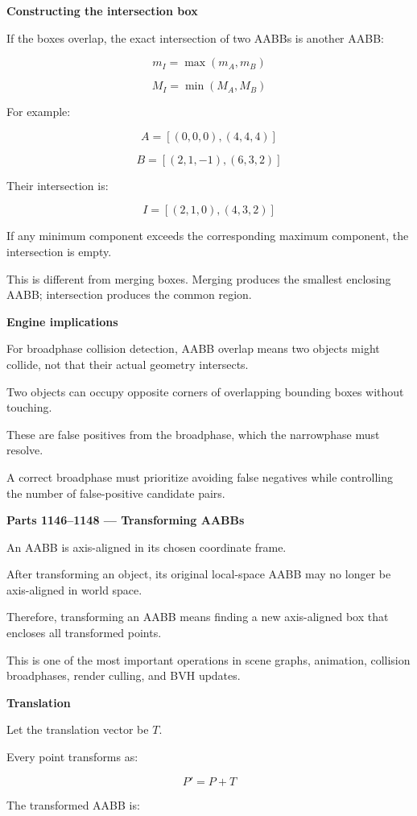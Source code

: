\textbf{Constructing the intersection box}

If the boxes overlap, the exact intersection of two AABBs is another AABB:

\[
\boxed{ m_I=\max(m_A,m_B) }
\]

\[
\boxed{ M_I=\min(M_A,M_B) }
\]

For example:

\[
A=[(0,0,0),(4,4,4)]
\]

\[
B=[(2,1,-1),(6,3,2)]
\]

Their intersection is:

\[
\boxed{I=[(2,1,0),(4,3,2)]}
\]

If any minimum component exceeds the corresponding maximum component, the intersection is empty.

This is different from merging boxes. Merging produces the smallest enclosing AABB; intersection produces the common region.

\textbf{Engine implications}

For broadphase collision detection, AABB overlap means two objects might collide, not that their actual geometry intersects.

Two objects can occupy opposite corners of overlapping bounding boxes without touching.

These are false positives from the broadphase, which the narrowphase must resolve.

A correct broadphase must prioritize avoiding false negatives while controlling the number of false-positive candidate pairs.

\textbf{Parts 1146--1148 --- Transforming AABBs}

An AABB is axis-aligned in its chosen coordinate frame.

After transforming an object, its original local-space AABB may no longer be axis-aligned in world space.

Therefore, transforming an AABB means finding a new axis-aligned box that encloses all transformed points.

This is one of the most important operations in scene graphs, animation, collision broadphases, render culling, and BVH updates.

\textbf{Translation}

Let the translation vector be \(T\).

Every point transforms as:

\[
P'=P+T
\]

The transformed AABB is:

